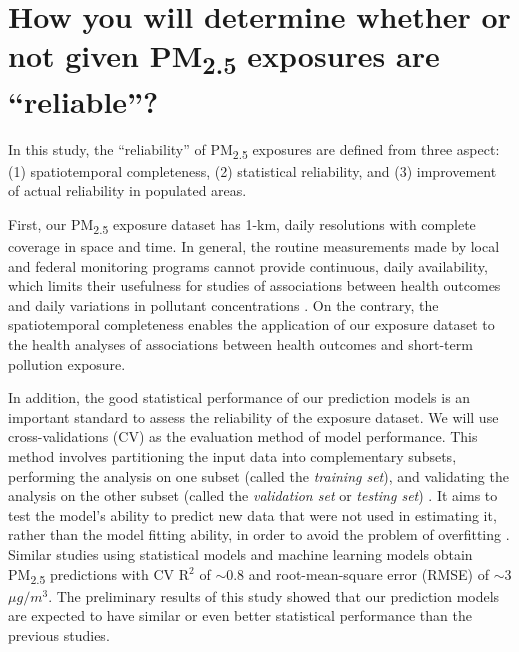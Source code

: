 \documentclass[11pt]{article}
\newcommand{\tsub}{\textsubscript}
\begin{document}
\section{How you will determine whether or not given \texorpdfstring{PM\tsub{2.5}}{PM2.5} exposures are ``reliable''?}
In this study, the ``reliability'' of PM\tsub{2.5} exposures are defined from three aspect: (1) spatiotemporal completeness, (2) statistical reliability, and (3) improvement of actual reliability in populated areas.
\begin{itemize*}
    \item First, our PM\tsub{2.5} exposure dataset has 1-km, daily resolutions with complete coverage in space and time. In general, the routine measurements made by local and federal monitoring programs cannot provide continuous, daily availability, which limits their usefulness for studies of associations between health outcomes and daily variations in pollutant concentrations \citep{sarnat2015fine}. On the contrary, the spatiotemporal completeness enables the application of our exposure dataset to the health analyses of associations between health outcomes and short-term pollution exposure. 
    \item In addition, the good statistical performance of our prediction models is an important standard to assess the reliability of the exposure dataset. We will use cross-validations (CV) as the evaluation method of model performance. This method involves partitioning the input data into complementary subsets, performing the analysis on one subset (called the \textit{training set}), and validating the analysis on the other subset (called the \textit{validation set} or \textit{testing set}) \citep{kohavi1995study}. It aims to test the model's ability to predict new data that were not used in estimating it, rather than the model fitting ability, in order to avoid the problem of overfitting \citep{hawkins2004problem}. Similar studies using statistical models \citep{kloog2011assessing, kloog2014new} and machine learning models \citep{di2016assessing, hu2017estimating} obtain PM\tsub{2.5} predictions with CV R$^2$ of $\sim$0.8 and root-mean-square error (RMSE) of $\sim$3 $\mu g/m^3$. The preliminary results of this study showed that our prediction models are expected to have similar or even better statistical performance than the previous studies. 

\end{itemize*}
\end{document}
